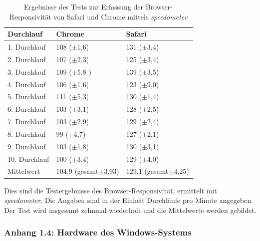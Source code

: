 \documentclass[a4paper]{scrartcl}
\begin{document}
\begin{table}[H]
	\centering
	\caption{Ergebnisse des Tests zur Erfassung der Browser-Responsivität von Safari und Chrome mittels \textit{speedometer}}
	\begin{center}
		\begin{tabularx}{\linewidth}{| l || X | X |}
			\hline
			Durchlauf & Chrome & Safari \\ 
			\hline \hline
			1. Durchlauf & 108 (\( \pm \)1,6) & 131 (\( \pm \)3,4) \\
			\hline
			2. Durchlauf & 107 (\( \pm \)2,3) & 125 (\( \pm \)3,4) \\
			\hline
			3. Durchlauf & 109 (\( \pm \)5,8 ) & 139 (\( \pm \)3,5) \\
			\hline
			4. Durchlauf & 106 (\( \pm \)1,6) & 123 (\( \pm \)9,0) \\
			\hline
			5. Durchlauf & 111 (\( \pm \)5,3) & 130 (\( \pm \)1,4) \\
			\hline
			6. Durchlauf & 103 (\( \pm \)3,1) & 128 (\( \pm \)2,5) \\
			\hline
			7. Durchlauf & 103 (\( \pm \)2,9) & 129 (\( \pm \)2,4) \\
			\hline
			8. Durchlauf & 99 (\( \pm \)4,7) & 127 (\( \pm \)2,1) \\
			\hline
			9. Durchlauf & 103 (\( \pm \)1,8) & 130 (\( \pm \)3,1) \\
			\hline
			10. Durchlauf & 100 (\( \pm \)3,4) & 129 (\( \pm \)4,0) \\
			\hline \hline
			Mittelwert & 104,9 (gesamt\( \pm \)3,93) & 129,1 (gesamt\( \pm \)4,25) \\ 
			\hline
		\end{tabularx}
	\end{center}
	Dies sind die Testergebnisse des Browser-Responsivität, ermittelt mit \textit{speedometer}. Die Angaben sind in der Einheit Durchläufe pro Minute angegeben. Der Test wird insgesamt zehnmal wiederholt und die Mittelwerte werden gebildet.
\end{table}

\newpage

\subsubsection*{Anhang 1.4: Hardware des Windows-Systems}
\end{document}
